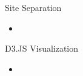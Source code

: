 
\begin{frame}{Site Separation}
    \begin{itemize}
        \item 
    \end{itemize}
\end{frame}

\begin{frame}{D3.JS Visualization}
    \begin{itemize}
        \item 
    \end{itemize}
\end{frame}